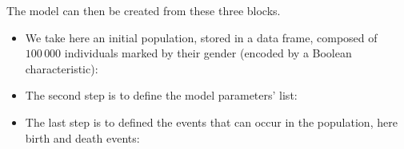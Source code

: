 The model can then be created from these three blocks.

\begin{itemize}
\tightlist
\item
  We take here an initial population, stored in a data frame, composed of \(100\,000\) individuals marked by their gender (encoded by a Boolean characteristic):
\end{itemize}

\begin{Shaded}
\begin{Highlighting}[]
\OtherTok{\textless{}{-}}\SpecialCharTok{$}
\end{Highlighting}
\end{Shaded}

\begin{itemize}
\tightlist
\item
  The second step is to define the model parameters' list:
\end{itemize}

\begin{Shaded}
\begin{Highlighting}[]
\OtherTok{\textless{}{-}} \NormalTok{(} \OtherTok{=} \NormalTok{, } \OtherTok{=} \NormalTok{, } \OtherTok{=} \NormalTok{,}
                \OtherTok{=} \NormalTok{(}\NormalTok{(}\NormalTok{,}\NormalTok{), }\NormalTok{(}\NormalTok{,}\NormalTok{,}\NormalTok{)))}
\end{Highlighting}
\end{Shaded}

\begin{itemize}
\tightlist
\item
  The last step is to defined the events that can occur in the population, here birth and death events:
\end{itemize}

\begin{Shaded}
\begin{Highlighting}[]
\OtherTok{\textless{}{-}} \NormalTok{(} \NormalTok{,}
                   \NormalTok{)}

\OtherTok{\textless{}{-}} \NormalTok{(} \NormalTok{, }
                   \NormalTok{,}
                   \NormalTok{)}
\end{Highlighting}
\end{Shaded}

